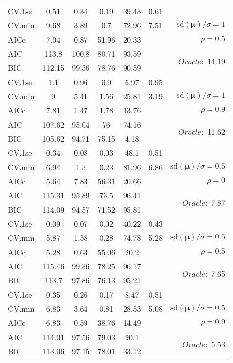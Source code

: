 \begin{table}
\begin{center}
\begin{tabular}{l*{5}{c}|r}
 \hline 
CV.1se & 0.51 & 0.34 & 0.19 & 39.43 & 0.61 & \\
CV.min & 9.68 & 3.89 & 0.7 & 72.96 & 7.51 &  $\mathrm{sd}(\mathbf{\mu})/\sigma=1$ \\
AICc & 7.04 & 0.87 & 51.96 & 20.33 & & $\rho=0.5$ \\
AIC & 113.8 & 100.8 & 80.71 & 93.59 & &  \multirow{2}{*}{$Oracle: $ 14.19} \\
BIC & 112.15 & 99.36 & 78.76 & 90.59 & &  \\
 \hline 
CV.1se & 1.1 & 0.96 & 0.9 & 6.97 & 0.95 & \\
CV.min & 9 & 5.41 & 1.56 & 25.81 & 3.19 &  $\mathrm{sd}(\mathbf{\mu})/\sigma=1$ \\
AICc & 7.81 & 1.47 & 1.78 & 13.76 & & $\rho=0.9$ \\
AIC & 107.62 & 95.04 & 76 & 74.16 & &  \multirow{2}{*}{$Oracle: $ 11.62} \\
BIC & 105.62 & 94.71 & 75.15 & 4.18 & &  \\
 \hline 
CV.1se & 0.34 & 0.08 & 0.03 & 48.1 & 0.51 & \\
CV.min & 6.94 & 1.3 & 0.23 & 81.96 & 6.86 &  $\mathrm{sd}(\mathbf{\mu})/\sigma=0.5$ \\
AICc & 5.64 & 7.83 & 56.31 & 20.66 & & $\rho=0$ \\
AIC & 115.31 & 95.89 & 73.5 & 96.41 & &  \multirow{2}{*}{$Oracle: $ 7.87} \\
BIC & 114.09 & 94.57 & 71.52 & 95.81 & &  \\
 \hline 
CV.1se & 0.09 & 0.07 & 0.02 & 40.22 & 0.43 & \\
CV.min & 5.87 & 1.58 & 0.28 & 74.78 & 5.28 &  $\mathrm{sd}(\mathbf{\mu})/\sigma=0.5$ \\
AICc & 5.28 & 0.63 & 55.06 & 20.2 & & $\rho=0.5$ \\
AIC & 115.46 & 99.36 & 78.25 & 96.17 & &  \multirow{2}{*}{$Oracle: $ 7.65} \\
BIC & 113.7 & 97.86 & 76.13 & 95.21 & &  \\
 \hline 
CV.1se & 0.35 & 0.26 & 0.17 & 8.47 & 0.51 & \\
CV.min & 6.83 & 3.64 & 0.81 & 28.53 & 5.08 &  $\mathrm{sd}(\mathbf{\mu})/\sigma=0.5$ \\
AICc & 6.83 & 0.59 & 38.76 & 14.49 & & $\rho=0.9$ \\
AIC & 114.01 & 97.56 & 79.03 & 90.1 & &  \multirow{2}{*}{$Oracle: $ 5.53} \\
BIC & 113.06 & 97.15 & 78.01 & 33.12 & &  \\
 \hline 
\end{tabular}
\end{center}
\vspace{-1cm}
\end{table}




